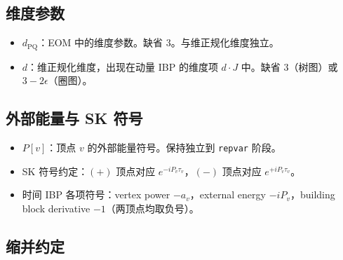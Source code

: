 ﻿\documentclass[a4paper,11pt]{article}
\begin{document}
\subsection{维度参数}

\begin{itemize}
  \item $d_{\text{PQ}}$：EOM 中的维度参数。缺省 $3$。与维正规化维度独立。
  \item $d$：维正规化维度，出现在动量 IBP 的维度项 $d \cdot J$ 中。缺省 $3$（树图）或 $3-2\epsilon$（圈图）。
\end{itemize}

\subsection{外部能量与 SK 符号}

\begin{itemize}
  \item $P[v]$：顶点 $v$ 的外部能量符号。保持独立到 \texttt{repvar} 阶段。
  \item SK 符号约定：$(+)$ 顶点对应 $e^{-iP_v \tau_v}$，$(-)$ 顶点对应 $e^{+iP_v \tau_v}$。
  \item 时间 IBP 各项符号：vertex power $-a_v$，external energy $-iP_v$，building block derivative $-1$（两顶点均取负号）。
\end{itemize}

\subsection{缩并约定}
\end{document}

